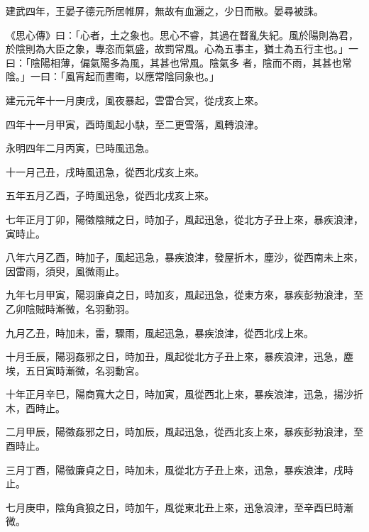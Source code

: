 \begin{pinyinscope}
 建武四年，王晏子德元所居帷屏，無故有血灑之，少日而散。晏尋被誅。



 《思心傳》曰：「心者，土之象也。思心不睿，其過在瞀亂失紀。風於陽則為君，於陰則為大臣之象，專恣而氣盛，故罰常風。心為五事主，猶土為五行主也。」一曰：「陰陽相薄，偏氣陽多為風，其甚也常風。陰氣多
 者，陰而不雨，其甚也常陰。」一曰：「風宵起而晝晦，以應常陰同象也。」



 建元元年十一月庚戌，風夜暴起，雲雷合冥，從戌亥上來。



 四年十一月甲寅，酉時風起小駃，至二更雪落，風轉浪津。



 永明四年二月丙寅，巳時風迅急。



 十一月己丑，戌時風迅急，從西北戌亥上來。



 五年五月乙酉，子時風迅急，從西北戌亥上來。



 七年正月丁卯，陽徵陰賊之日，時加子，風起迅急，從北方子丑上來，暴疾浪津，寅時止。



 八年六月乙酉，時加子，風起迅急，暴疾浪津，發屋折木，塵沙，從西南未上來，因雷雨，須臾，風微雨止。



 九年七月甲寅，陽羽廉貞之日，時加亥，風起迅急，從東方來，暴疾彭勃浪津，至乙卯陰賊時漸微，名羽動羽。



 九月乙丑，時加未，雷，驟雨，風起迅急，暴疾浪津，從西北戌上來。



 十月壬辰，陽羽姦邪之日，時加丑，風起從北方子丑上來，暴疾浪津，迅急，塵埃，五日寅時漸微，名羽動宮。



 十年正月辛巳，陽商寬大之日，時加寅，風從西北上來，暴疾浪津，迅急，揚沙折木，酉時止。



 二月甲辰，陽徵姦邪之日，時加辰，風起迅急，從西北亥上來，暴疾彭勃浪津，至酉時止。



 三月丁酉，陽徵廉貞之日，時加未，風從北方子丑上來，迅急，暴疾浪津，戌時止。



 七月庚申，陰角貪狼之日，時加午，風從東北丑上來，迅急浪津，至辛酉巳時漸微。




\end{pinyinscope}
